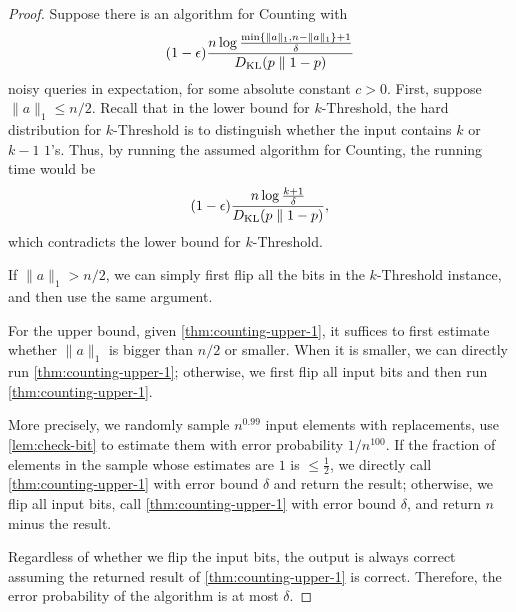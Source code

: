 \Counting*
\begin{proof}

Suppose there is an algorithm for Counting with
\[
(1-\epsilon)\frac{n \log \frac{\min\{\lVert a \rVert_1, n - \lVert a \rVert_1\} + 1}{\delta}}{D_{\operatorname{\mathrm{KL}}}(p \parallel 1-p)}
\]
noisy queries in expectation, for some absolute constant $c>0$. First, suppose $\lVert a \rVert_1 \le n / 2$. Recall that in the lower bound for $k$-Threshold, the hard distribution for $k$-Threshold is to distinguish whether the input contains $k$ or $k-1$ $1$'s. Thus, by running the assumed algorithm for Counting, the running time would be
\[
(1-\epsilon)\frac{n \log \frac{k + 1}{\delta}}{D_{\operatorname{\mathrm{KL}}}(p \parallel 1-p)},
\]
which contradicts the lower bound for $k$-Threshold.

If $\lVert a \rVert_1 > n / 2$, we can simply first flip all the bits in the $k$-Threshold instance, and then use the same argument.


For the upper bound, given \cref{thm:counting-upper-1}, it suffices to first estimate whether $\lVert a \rVert_1$ is bigger than $n/2$ or smaller. When it is smaller, we can directly run \cref{thm:counting-upper-1}; otherwise, we first flip all input bits and then run \cref{thm:counting-upper-1}.

More precisely, we randomly sample $n^{0.99}$ input elements with replacements, use \cref{lem:check-bit} to estimate them with error probability $1/n^{100}$. If the fraction of elements in the sample whose estimates are $1$ is $\le \frac{1}{2}$, we directly call \cref{thm:counting-upper-1} with error bound $\delta$ and return the result; otherwise, we flip all input bits, call \cref{thm:counting-upper-1} with error bound $\delta$, and return $n$ minus the result.

Regardless of whether we flip the input bits, the output is always correct assuming the returned result of \cref{thm:counting-upper-1} is correct. Therefore, the error probability of the algorithm is at most $\delta$.


\end{proof}
